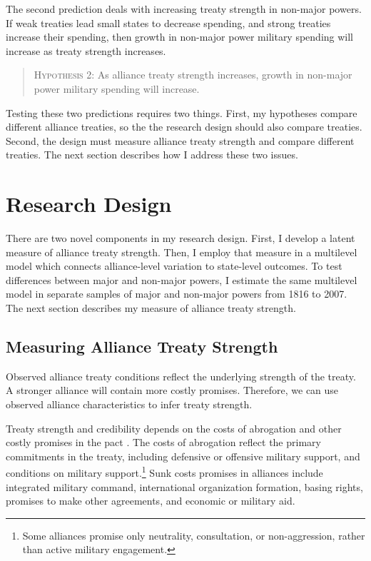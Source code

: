 \documentclass[12pt]{article}
\begin{document}
The second prediction deals with increasing treaty strength in non-major powers. 
If weak treaties lead small states to decrease spending, and strong treaties increase their spending, then growth in non-major power military spending will increase as treaty strength increases. 


\begin{quote}
\textsc{Hypothesis 2}: As alliance treaty strength increases, growth in non-major power military spending will increase. 
\end{quote}


Testing these two predictions requires two things. 
First, my hypotheses compare different alliance treaties, so the the research design should also compare treaties. 
Second, the design must measure alliance treaty strength and compare different treaties.  
The next section describes how I address these two issues. 


\section{Research Design} 



There are two novel components in my research design. 
First, I develop a latent measure of alliance treaty strength. 
Then, I employ that measure in a multilevel model which connects alliance-level variation to state-level outcomes. 
To test differences between major and non-major powers, I estimate the same multilevel model in separate samples of major and non-major powers from 1816 to 2007. 
The next section describes my measure of alliance treaty strength. 


\subsection{Measuring Alliance Treaty Strength} 

Observed alliance treaty conditions reflect the underlying strength of the treaty. 
A stronger alliance will contain more costly promises. 
Therefore, we can use observed alliance characteristics to infer treaty strength.


Treaty strength and credibility depends on the costs of abrogation and other costly promises in the pact \citep{Leeds2003}. 
The costs of abrogation reflect the primary commitments in the treaty, including defensive or offensive military support, and conditions on military support.\footnote{Some alliances promise only neutrality, consultation, or non-aggression, rather than active military engagement.}  
Sunk costs promises in alliances include integrated military command, international organization formation, basing rights, promises to make other agreements, and economic or military aid. 
\end{document}
